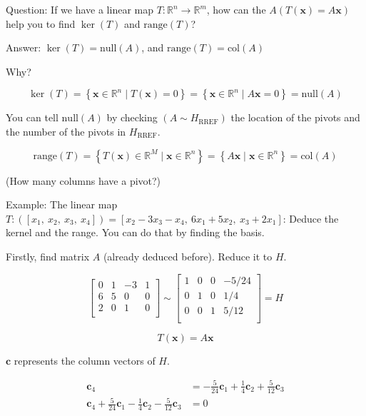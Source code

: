\documentclass[12pt]{article}
\theoremstyle{plain}
\theoremstyle{remark}
\theoremstyle{definition}
\begin{document}
Question: If we have a linear map
\(T:\mathbb{R}^{n} \rightarrow \mathbb{R}^{m}\), how can the
\(A(T\left( \mathbf{x} \right) = A\mathbf{x})\) help you to find
\(\ker(T)\) and \(\text{range}{(T)}\)?

Answer: \(\ker(T) = \text{null}{(A)}\), and
\(\text{range}{(T)} = \text{col}(A)\)

Why?

\[\ker(T) = \left\{ \mathbf{x} \in \mathbb{R}^{n}\mid T\left( \mathbf{x} \right) = 0 \right\} = \left\{ \mathbf{x} \in \mathbb{R}^{n}\mid A\mathbf{x} = 0 \right\} = \text{null}(A)\]

You can tell \(\text{null}(A)\) by checking
\(\left( A\sim H_{\text{RREF}} \right)\) the location of the pivots and
the number of the pivots in \(H_{\text{RREF}}\).

\[\text{range}{(T)} = \left\{ T\left( \mathbf{x} \right) \in \mathbb{R}^{M}\mid\mathbf{x} \in \mathbb{R}^{n} \right\} = \left\{ A\mathbf{x}\mid\mathbf{x} \in \mathbb{R}^{n} \right\} = \text{col}(A)\]

(How many columns have a pivot?)

Example: The linear map
\(T:\left( \left\lbrack x_{1},\ x_{2},\ x_{3},\ x_{4} \right\rbrack \right) = \left\lbrack x_{2} - 3x_{3} - x_{4},\ 6x_{1} + 5x_{2},\ x_{3} + 2x_{1} \right\rbrack\):
Deduce the kernel and the range. You can do that by finding the basis.

Firstly, find matrix \(A\) (already deduced before). Reduce it to \(H\).

\[\begin{bmatrix}
0 & 1 & - 3 & 1 \\
6 & 5 & 0 & 0 \\
2 & 0 & 1 & 0 \\
\end{bmatrix}\sim\begin{bmatrix}
1 & 0 & 0 & - 5/24 \\
0 & 1 & 0 & 1/4 \\
0 & 0 & 1 & 5/12 \\
\end{bmatrix} = H\]

\[T\left( \mathbf{x} \right) = A\mathbf{x}\]

\(\mathbf{c}\) represents the column vectors of \(H\).

\begin{align*}
{\mathbf{c}}_{4} &= - \frac{5}{24}{\mathbf{c}}_{1} + \frac{1}{4}{\mathbf{c}}_{2} + \frac{5}{12}{\mathbf{c}}_{3} \\
{\mathbf{c}}_{4} + \frac{5}{24}{\mathbf{c}}_{1} - \frac{1}{4}{\mathbf{c}}_{2} - \frac{5}{12}{\mathbf{c}}_{3} &= 0
\end{align*}
\end{document}
